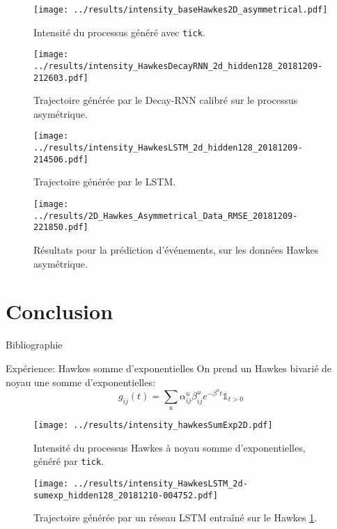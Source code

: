 \documentclass{beamer}
\begin{document}
\begin{frame}
\begin{figure}
	\texttt{[image: ../results/intensity\_baseHawkes2D\_asymmetrical.pdf]}
	\caption{Intensité du processus généré avec \texttt{tick}.}
\end{figure}
\end{frame}

\begin{frame}
\begin{figure}
	\texttt{[image: ../results/intensity\_HawkesDecayRNN\_2d\_hidden128\_20181209-212603.pdf]}
	\caption{Trajectoire générée par le Decay-RNN calibré sur le processus asymétrique.}	
\end{figure}
\end{frame}

\begin{frame}
\begin{figure}
	\texttt{[image: ../results/intensity\_HawkesLSTM\_2d\_hidden128\_20181209-214506.pdf]}
	\caption{Trajectoire générée par le LSTM.}
\end{figure}
\end{frame}

\begin{frame}
\begin{figure}
	\texttt{[image: ../results/2D\_Hawkes\_Asymmetrical\_Data\_RMSE\_20181209-221850.pdf]}
	\caption{Résultats pour la prédiction d'événements, sur les données Hawkes asymétrique.}
\end{figure}
\end{frame}

\section{Conclusion}

\begin{frame}[t,allowframebreaks]{Bibliographie}
	\printbibliography
\end{frame}

\appendix

\begin{frame}{Expérience: Hawkes somme d'exponentielles}
On prend un Hawkes bivarié de noyau une somme d'exponentielles:
\[
	g_{ij}(t) = \sum_u \alpha_{ij}^u\beta_{ij}^u e^{-\beta^ut}\mathds{1}_{t > 0}
\]
\end{frame}

\begin{frame}
\begin{figure}
	\texttt{[image: ../results/intensity\_hawkesSumExp2D.pdf]}
	\caption{Intensité du processus Hawkes à noyau somme d'exponentielles, généré par \texttt{tick}.}\label{fig:hawkesSumExpIntensityPlot}
\end{figure}
\end{frame}

\begin{frame}
\begin{figure}
	\texttt{[image: ../results/intensity\_HawkesLSTM\_2d-sumexp\_hidden128\_20181210-004752.pdf]}
	\caption{Trajectoire générée par un réseau LSTM entraîné sur le Hawkes \cref{fig:hawkesSumExpIntensityPlot}.}
\end{figure}
\end{frame}
\end{document}
